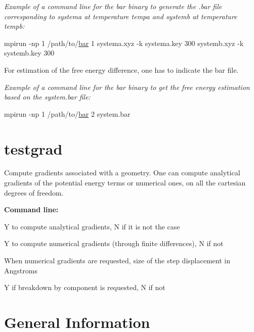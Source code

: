 {\itshape Example of a command line for the bar binary to generate the {\ttfamily .bar} file corresponding to systema at temperature tempa and systemb at temperature tempb\-:}


\begin{DoxyCode}
mpirun -np 1 /path/to/\hyperlink{bar_8f90_a75dfe3f0be9db5c03a0c04398460d0b5}{bar} 1 systema.xyz -k systema.key 300 systemb.xyz -k systemb.key 300
\end{DoxyCode}



\begin{DoxyItemize}
\item For estimation of the free energy difference, one has to indicate the bar file.
\end{DoxyItemize}

{\itshape Example of a command line for the bar binary to get the free energy estimation based on the {\ttfamily system.\-bar} file\-:}


\begin{DoxyCode}
mpirun -np 1 /path/to/\hyperlink{bar_8f90_a75dfe3f0be9db5c03a0c04398460d0b5}{bar} 2 system.bar
\end{DoxyCode}
\hypertarget{tinker_hp_suite_program_testgrad}{}\section{testgrad}\label{tinker_hp_suite_program_testgrad}
Compute gradients associated with a geometry. One can compute analytical gradients of the potential energy terms or numerical ones, on all the cartesian degrees of freedom.
\begin{DoxyItemize}
\item {\bfseries Command line\-:}
\begin{DoxyItemize}
\item {\ttfamily Y} to compute analytical gradients, {\ttfamily N} if it is not the case
\item {\ttfamily Y} to compute numerical gradients (through finite differences), {\ttfamily N} if not
\item When numerical gradients are requested, size of the step displacement in Angstroms
\item {\ttfamily Y} if breakdown by component is requested, {\ttfamily N} if not 


\end{DoxyItemize}
\end{DoxyItemize}\hypertarget{tinker_hp_suite_general_information}{}\section{General Information}\label{tinker_hp_suite_general_information}

